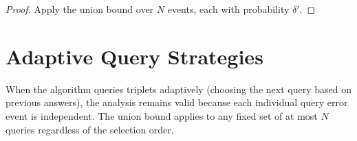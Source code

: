 \begin{proof}
Apply the union bound over $N$ events, each with probability $\delta'$.
\end{proof}

\section{Adaptive Query Strategies}

When the algorithm queries triplets adaptively (choosing the next query based on previous answers), the analysis remains valid because each individual query error event is independent. The union bound applies to any fixed set of at most $N$ queries regardless of the selection order.


